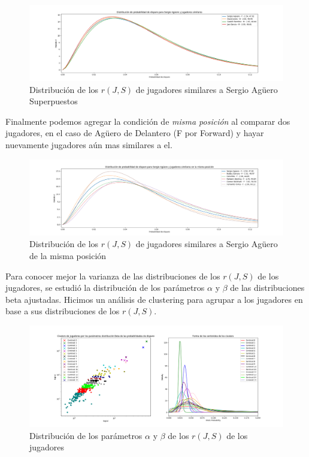 \documentclass[
  a4paper,
]{article}
\begin{document}
\begin{figure}
  \includegraphics{recursos_pdf/graficos/Sergio_Aguero_and_similar_players_shots_prob_beta_binomial.png}
    \caption{Distribución de los $r(J, S)$ de jugadores similares a Sergio Agüero Superpuestos}
\end{figure}

Finalmente podemos agregar la condición de \emph{misma posición} al
comparar dos jugadores, en el caso de Agüero de Delantero (F por
Forward) y hayar nuevamente jugadores aún mas similares a el.

\begin{figure}
  \includegraphics{recursos_pdf/graficos/Sergio_Aguero_and_similar_players_same_position_shots_prob_beta_binomial.png}
    \caption{Distribución de los $r(J, S)$ de jugadores similares a Sergio Agüero de la misma posición}
\end{figure}

Para conocer mejor la varianza de las distribuciones de los \(r(J, S)\)
de los jugadores, se estudió la distribución de los parámetros
\(\alpha\) y \(\beta\) de las distribuciones beta ajustadas. Hicimos un
análisis de clustering para agrupar a los jugadores en base a sus
distribuciones de los \(r(J, S)\).

\begin{figure}
  \includegraphics{recursos_pdf/graficos/Clusters_of_Players_shots_prob_beta_binomial.png}
    \caption{Distribución de los parámetros $\alpha$ y $\beta$ de los $r(J, S)$ de los jugadores}
\end{figure}
\end{document}
